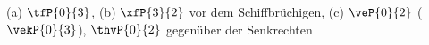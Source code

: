 (a) $\tfP{0}{3}$, (b) $\xfP{3}{2}$ vor dem Schiffbrüchigen, (c) $\veP{0}{2}$ ($\vekP{0}{3}$), $\thvP{0}{2}$ gegenüber der Senkrechten
